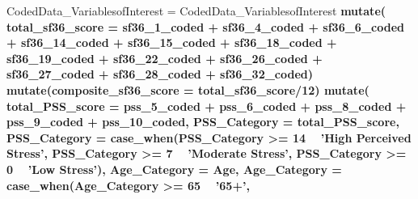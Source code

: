 \documentclass[]{article}
\newenvironment{Shaded}{\begin{snugshade}}{\end{snugshade}}
\newcommand{\DataTypeTok}[1]{\textcolor[rgb]{0.13,0.29,0.53}{#1}}
\newcommand{\DecValTok}[1]{\textcolor[rgb]{0.00,0.00,0.81}{#1}}
\newcommand{\KeywordTok}[1]{\textcolor[rgb]{0.13,0.29,0.53}{\textbf{#1}}}
\newcommand{\NormalTok}[1]{#1}
\newcommand{\OperatorTok}[1]{\textcolor[rgb]{0.81,0.36,0.00}{\textbf{#1}}}
\newcommand{\StringTok}[1]{\textcolor[rgb]{0.31,0.60,0.02}{#1}}
\begin{document}
\begin{Shaded}
\begin{Highlighting}[]
\NormalTok{CodedData_VariablesofInterest =}\StringTok{ }
\NormalTok{CodedData_VariablesofInterest }\OperatorTok{%>%}\StringTok{ }
\StringTok{  }\KeywordTok{mutate}\NormalTok{(}
    \DataTypeTok{total_sf36_score =}\NormalTok{ sf36_}\DecValTok{1}\NormalTok{_coded }\OperatorTok{+}\StringTok{ }\NormalTok{sf36_}\DecValTok{4}\NormalTok{_coded }\OperatorTok{+}\StringTok{ }\NormalTok{sf36_}\DecValTok{6}\NormalTok{_coded }\OperatorTok{+}\StringTok{ }\NormalTok{sf36_}\DecValTok{14}\NormalTok{_coded }\OperatorTok{+}
\StringTok{    }\NormalTok{sf36_}\DecValTok{15}\NormalTok{_coded }\OperatorTok{+}\StringTok{ }\NormalTok{sf36_}\DecValTok{18}\NormalTok{_coded }\OperatorTok{+}\StringTok{ }\NormalTok{sf36_}\DecValTok{19}\NormalTok{_coded }\OperatorTok{+}\StringTok{ }\NormalTok{sf36_}\DecValTok{22}\NormalTok{_coded }\OperatorTok{+}\StringTok{ }
\StringTok{    }\NormalTok{sf36_}\DecValTok{26}\NormalTok{_coded }\OperatorTok{+}\StringTok{ }\NormalTok{sf36_}\DecValTok{27}\NormalTok{_coded }\OperatorTok{+}\StringTok{ }\NormalTok{sf36_}\DecValTok{28}\NormalTok{_coded }\OperatorTok{+}\StringTok{ }\NormalTok{sf36_}\DecValTok{32}\NormalTok{_coded) }\OperatorTok{%>%}\StringTok{ }
\StringTok{  }\KeywordTok{mutate}\NormalTok{(}\DataTypeTok{composite_sf36_score =}\NormalTok{ total_sf36_score}\OperatorTok{/}\DecValTok{12}\NormalTok{) }\OperatorTok{%>%}\StringTok{ }
\StringTok{  }\KeywordTok{mutate}\NormalTok{(}
    \DataTypeTok{total_PSS_score =}\NormalTok{ pss_}\DecValTok{5}\NormalTok{_coded }\OperatorTok{+}\StringTok{ }\NormalTok{pss_}\DecValTok{6}\NormalTok{_coded }\OperatorTok{+}\StringTok{ }\NormalTok{pss_}\DecValTok{8}\NormalTok{_coded }\OperatorTok{+}\StringTok{ }\NormalTok{pss_}\DecValTok{9}\NormalTok{_coded }\OperatorTok{+}\StringTok{ }\NormalTok{pss_}\DecValTok{10}\NormalTok{_coded,}
    \DataTypeTok{PSS_Category =}\NormalTok{ total_PSS_score, }
    \DataTypeTok{PSS_Category =} 
          \KeywordTok{case_when}\NormalTok{(PSS_Category }\OperatorTok{>=}\StringTok{ }\DecValTok{14} \OperatorTok{~}\StringTok{ 'High Perceived Stress'}\NormalTok{,}
\NormalTok{                    PSS_Category }\OperatorTok{>=}\StringTok{ }\DecValTok{7} \OperatorTok{~}\StringTok{ 'Moderate Stress'}\NormalTok{,}
\NormalTok{                    PSS_Category }\OperatorTok{>=}\StringTok{ }\DecValTok{0}  \OperatorTok{~}\StringTok{ 'Low Stress'}\NormalTok{),}
    \DataTypeTok{Age_Category =}\NormalTok{ Age,}
    \DataTypeTok{Age_Category =} 
          \KeywordTok{case_when}\NormalTok{(Age_Category }\OperatorTok{>=}\StringTok{ }\DecValTok{65}  \OperatorTok{~}\StringTok{ '65+'}\NormalTok{,}
}}}
\end{Highlighting}
\end{Shaded}
\end{document}
